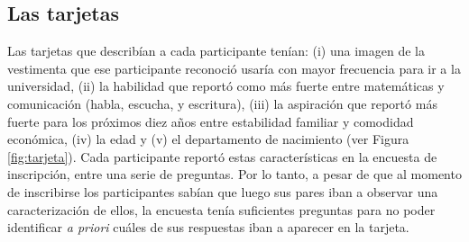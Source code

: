 \subsection{Las tarjetas}
Las tarjetas que describían a cada participante tenían: (i) una imagen de la vestimenta que ese participante reconoció usaría con mayor frecuencia para ir a la universidad, (ii) la habilidad que reportó como más fuerte entre matemáticas y comunicación (habla, escucha, y escritura), (iii) la aspiración que reportó más fuerte para los próximos diez años entre estabilidad familiar y comodidad económica, (iv) la edad y (v) el departamento de nacimiento (ver Figura \ref{fig:tarjeta}). Cada participante reportó estas características en la encuesta de inscripción, entre una serie de preguntas. Por lo tanto, a pesar de que al momento de inscribirse los participantes sabían que luego sus pares iban a observar una caracterización de ellos, la encuesta tenía suficientes preguntas para no poder identificar \textit{a priori} cuáles de sus respuestas iban a aparecer en la tarjeta. 


